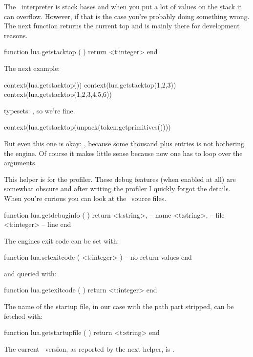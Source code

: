 The \LUA\ interpreter is stack bases and when you put a lot of values on the stack
it can overflow. However, if that is the case you're probably doing something wrong.
The next function returns the current top and is mainly there for development reasons.

\starttyping[option=LUA]
function lua.getstacktop ( )
    return <t:integer>
end
\stoptyping

The next example:

\startbuffer
\startluacode
context(lua.getstacktop())
context(lua.getstacktop(1,2,3))
context(lua.getstacktop(1,2,3,4,5,6))
\stopluacode
\stopbuffer

\typebuffer

typesets: \inlinebuffer, so we're fine.

\startbuffer
\startluacode
context(lua.getstacktop(unpack(token.getprimitives())))
\stopluacode
\stopbuffer

\typebuffer

But even this one is okay: \inlinebuffer, because some thousand plus entries is not
bothering the engine. Of course it makes little sense because now one has to loop
over the arguments.

This helper is for the profiler. These debug features (when enabled at all) are
somewhat obscure and after writing the profiler I quickly forgot the details.
When you're curious you can look at the \CONTEXT\ source files.

\starttyping[option=LUA]
function lua.getdebuginfo ( )
    return
        <t:string>, -- name
        <t:string>, -- file
        <t:integer> -- line
end
\stoptyping

The engines exit code can be set with:

\starttyping[option=LUA]
function lua.setexitcode ( <t:integer> )
    -- no return values
end
\stoptyping

and queried with:

\starttyping[option=LUA]
function lua.getexitcode ( )
    return <t:integer>
end
\stoptyping

The name of the startup file, in our case  with the path part stripped, can be
fetched with:

\starttyping[option=LUA]
function lua.getstartupfile ( )
    return <t:string>
end
\stoptyping

The current \LUA\ version, as reported by the next helper, is .

